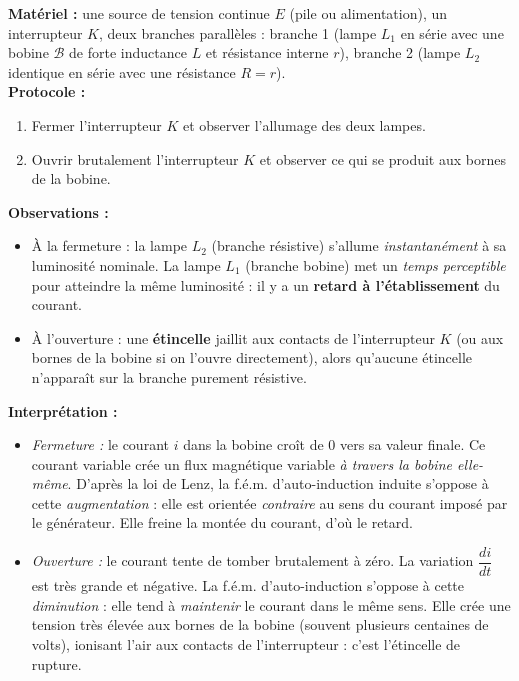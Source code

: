 \documentclass[11pt]{article}
\begin{document}
\begin{experience}
\textbf{Matériel :} une source de tension continue $E$ (pile ou alimentation), un interrupteur $K$, deux branches parallèles : branche 1 (lampe $L_1$ en série avec une bobine $\mathcal{B}$ de forte inductance $L$ et résistance interne $r$), branche 2 (lampe $L_2$ identique en série avec une résistance $R = r$).\\
\textbf{Protocole :}
\begin{enumerate}
\item Fermer l'interrupteur $K$ et observer l'allumage des deux lampes.
\item Ouvrir brutalement l'interrupteur $K$ et observer ce qui se produit aux bornes de la bobine.
\end{enumerate}
\textbf{Observations :}
\begin{itemize}
\item À la fermeture : la lampe $L_2$ (branche résistive) s'allume \emph{instantanément} à sa luminosité nominale. La lampe $L_1$ (branche bobine) met un \emph{temps perceptible} pour atteindre la même luminosité : il y a un \textbf{retard à l'établissement} du courant.
\item À l'ouverture : une \textbf{étincelle} jaillit aux contacts de l'interrupteur $K$ (ou aux bornes de la bobine si on l'ouvre directement), alors qu'aucune étincelle n'apparaît sur la branche purement résistive.
\end{itemize}
\textbf{Interprétation :}
\begin{itemize}
\item \emph{Fermeture :} le courant $i$ dans la bobine croît de $0$ vers sa valeur finale. Ce courant variable crée un flux magnétique variable \emph{à travers la bobine elle-même}. D'après la loi de Lenz, la f.é.m. d'auto-induction induite s'oppose à cette \emph{augmentation} : elle est orientée \emph{contraire} au sens du courant imposé par le générateur. Elle freine la montée du courant, d'où le retard.
\item \emph{Ouverture :} le courant tente de tomber brutalement à zéro. La variation $\dfrac{di}{dt}$ est très grande et négative. La f.é.m. d'auto-induction s'oppose à cette \emph{diminution} : elle tend à \emph{maintenir} le courant dans le même sens. Elle crée une tension très élevée aux bornes de la bobine (souvent plusieurs centaines de volts), ionisant l'air aux contacts de l'interrupteur : c'est l'étincelle de rupture.
\end{itemize}
\end{experience}
\end{document}
